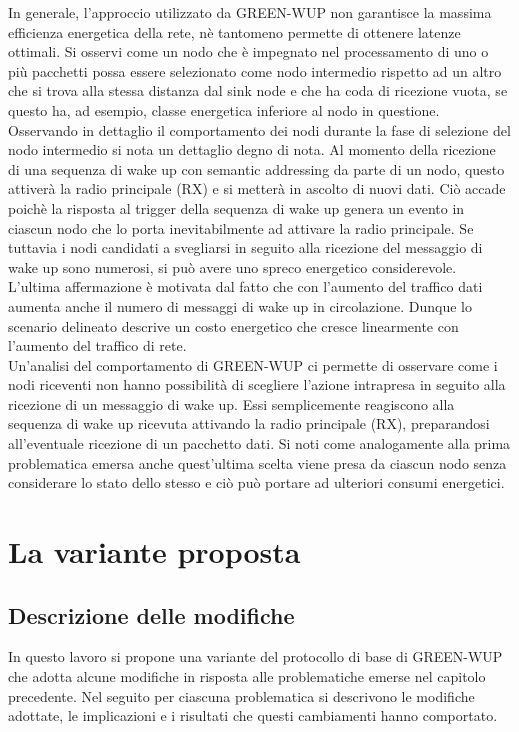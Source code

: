 \documentclass[binding=0.6cm,TFA]{sapthesis}
\begin{document}
In generale, l'approccio utilizzato da GREEN-WUP non garantisce la massima efficienza energetica della rete, nè tantomeno permette di ottenere latenze ottimali.
Si osservi come un nodo che è impegnato nel processamento di uno o più pacchetti possa essere selezionato come nodo intermedio rispetto ad un altro che si
trova alla stessa distanza dal sink node e che ha coda di ricezione vuota, se questo ha, ad esempio, classe energetica inferiore al nodo in questione. \\

Osservando in dettaglio il comportamento dei nodi durante la fase di selezione del nodo intermedio si nota un dettaglio degno di nota.
Al momento della ricezione di una sequenza di wake up con semantic addressing da parte di un nodo, questo attiverà la radio principale (RX) e si metterà
in ascolto di nuovi dati. Ciò accade poichè la risposta al trigger della sequenza di wake up genera un evento in ciascun nodo che lo porta
inevitabilmente ad attivare la radio principale. Se tuttavia i nodi candidati a svegliarsi in seguito alla ricezione del messaggio di wake up sono
numerosi, si può avere uno spreco energetico considerevole. L'ultima affermazione è motivata dal fatto che con l'aumento del traffico dati aumenta
anche il numero di messaggi di wake up in circolazione. Dunque lo scenario delineato descrive un costo energetico che cresce linearmente con l'aumento
del traffico di rete.\\

Un'analisi del comportamento di GREEN-WUP ci permette di osservare come i nodi riceventi non hanno possibilità di scegliere l'azione
intrapresa in seguito alla ricezione di un messaggio di wake up. Essi semplicemente reagiscono alla sequenza di wake up ricevuta attivando la radio principale (RX),
preparandosi all'eventuale ricezione di un pacchetto dati. Si noti come analogamente alla prima problematica emersa anche quest'ultima scelta viene presa da
ciascun nodo senza considerare lo stato dello stesso e ciò può portare ad ulteriori consumi energetici.

\chapter{La variante proposta}

\section{Descrizione delle modifiche}

In questo lavoro si propone una variante del protocollo di base di GREEN-WUP che adotta alcune modifiche in risposta alle problematiche emerse nel capitolo
precedente. Nel seguito per ciascuna problematica si descrivono le modifiche adottate, le implicazioni e i risultati che questi cambiamenti hanno comportato.\\
\end{document}
